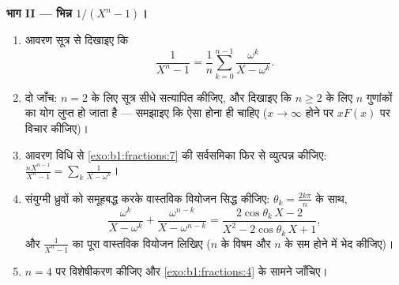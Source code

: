 \begin{problem}
\medskip \noindent\textbf{भाग II --- भिन्न $1/(X^n - 1)$।}
\begin{enumerate}[resume]
  \item आवरण सूत्र से दिखाइए कि
        \[
        \frac{1}{X^n - 1}
        = \frac1n\sum_{k=0}^{n-1}\frac{\omega^k}{X - \omega^k} .
        \]
  \item दो जाँच: $n = 2$ के लिए सूत्र सीधे सत्यापित कीजिए, और दिखाइए कि $n
  \geq 2$ के लिए $n$ गुणांकों का योग लुप्त हो जाता है --- समझाइए कि ऐसा होना
  ही चाहिए ($x \to \infty$ होने पर $xF(x)$ पर विचार कीजिए)।
  \item आवरण विधि से \cref{exo:b1:fractions:7} की सर्वसमिका फिर से
  व्युत्पन्न कीजिए: $\frac{nX^{n-1}}{X^n-1} = \sum_k \frac1{X - \omega^k}$।
  \item संयुग्मी ध्रुवों को समूहबद्ध करके वास्तविक वियोजन सिद्ध कीजिए:
  $\theta_k = \frac{2k\pi}n$ के साथ,
        \[
        \frac{\omega^k}{X - \omega^k} +
        \frac{\omega^{n-k}}{X - \omega^{n-k}}
        = \frac{2\cos\theta_k\,X - 2}
        {X^2 - 2\cos\theta_k\,X + 1} ,
        \]
        और $\frac1{X^n-1}$ का पूरा वास्तविक वियोजन लिखिए ($n$ के विषम और $n$
        के सम होने में भेद कीजिए)।
  \item $n = 4$ पर विशेषीकरण कीजिए और \cref{exo:b1:fractions:4} के सामने
  जाँचिए।
\end{enumerate}


\end{problem}
